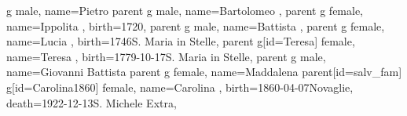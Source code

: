 \documentclass{article}
\begin{document}
\begin{midpage}
\begin{center}
\begin{genealogypicture}
{{{{{{{{{                                    g{
                                        male,
                                        name={Pietro }
                                    }
                                    parent{
                                        g{
                                            male,
                                            name={Bartolomeo },
                                        }
                                    }
                                }
                                parent{
                                    g{
                                        female,
                                        name={Ippolita },
                                        birth={1720}{},
                                    }
                                    parent{
                                        g{
                                            male,
                                            name={Battista },
                                        }
                                    }
                                }
                            }
                            parent{
                                g{
                                    female,
                                    name={Lucia },
                                    birth={1746}{S. Maria in Stelle},
                                }
                            }
                        }
                        parent{
                            g[id=Teresa]{
                                female,
                                name={Teresa },
                                birth={1779-10-17}{S. Maria in Stelle},
                            }
                            parent{
                                g{
                                    male,
                                    name={Giovanni Battista }
                                }
                            }
                            parent{
                                g{
                                    female,
                                    name={Maddalena }
                                }
                            }
                        }
                    }
                }
                parent[id=salv_fam]{
                    g[id=Carolina1860]{
                        female,
                        name={Carolina },
                        birth={1860-04-07}{Novaglie},
                        death={1922-12-13}{S. Michele Extra},
}}}}}}
\end{genealogypicture}
\end{center}
\end{midpage}
\end{document}
